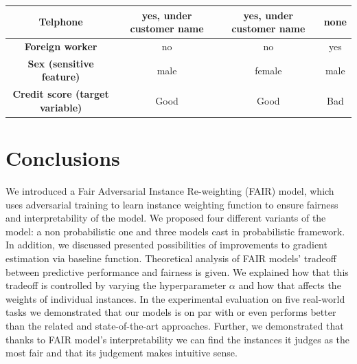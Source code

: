 \documentclass[preprint,12pt]{elsarticle}
\begin{document}
\begin{table}
{\begin{tabular}{|c|c|c|c|}
		\textbf{Telphone}                                        & yes,   under customer name & yes,   under customer name                                                           & none                                                                                 \\ \hline
		\textbf{Foreign worker}                                  & no                         & no                                                                                   & yes                                                                                  \\ \hline
		\textbf{Sex (sensitive feature)}                                             & male                       & female                                                                               & male                                                                                 \\ \hline
		\textbf{Credit score (target variable)}                                           & Good                       & Good                                                                                 & Bad                                                                                  \\ \hline
	\end{tabular}}
	\label{tab:Explainability}
\end{table}

\section{Conclusions}
\label{Sec:Conclusion}
We introduced a Fair Adversarial Instance Re-weighting (FAIR) model, which uses adversarial training to learn instance weighting function to ensure fairness and interpretability of the model. We proposed four different variants of the model: a non probabilistic one and three models cast in probabilistic framework. In addition, we discussed presented possibilities of improvements to gradient estimation via baseline function. Theoretical analysis of FAIR models' tradeoff between predictive performance and fairness is given. We explained how that this tradeoff is controlled by varying the hyperparameter $\alpha$ and how that affects the weights of individual instances. In the experimental evaluation on five real-world tasks we demonstrated that our models is on par with or even performs better than the related and state-of-the-art approaches. Further, we demonstrated that thanks to FAIR model's interpretability we can find the instances it judges as the most fair and that its judgement makes intuitive sense.
\end{document}
